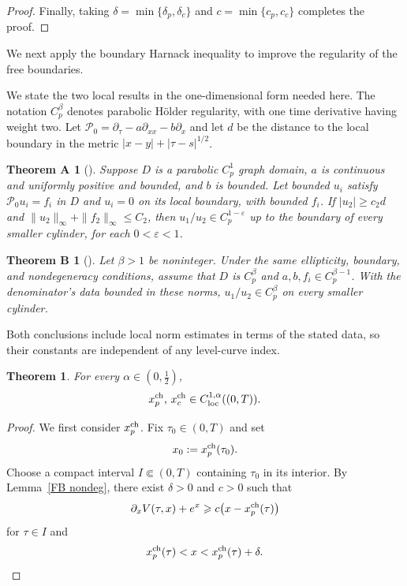 \documentclass[11pt, a4paper, leqno]{amsart}
\numberwithin{equation}{section}
\theoremstyle{plain}
\newtheorem{theorem}{Theorem}[section]
\newtheorem*{bhfirst}{Theorem A}
\newtheorem*{bhhigher}{Theorem B}
\theoremstyle{definition}
\theoremstyle{remark}
\def\leq{\leqslant}
\def\geq{\geqslant}
\begin{document}
{\begin{proof}
Finally, taking
$\delta=\min\{\delta_p,\delta_c\}$ and
$c=\min\{c_p,c_c\}$ completes the proof.
\end{proof}

We next apply the boundary Harnack inequality to improve the
regularity of the free boundaries.

{
We state the two local results in the one-dimensional form needed here.
The notation $C_p^\beta$ denotes parabolic H\"older regularity, with
one time derivative having weight two. Let
$\mathcal P_0=\partial_\tau-a\partial_{xx}-b\partial_x$ and
let $d$ be the distance to the local boundary in the metric
$|x-y|+|\tau-s|^{1/2}$.

\begin{bhfirst}[{\cite[Theorem~1.2]{Kukuljan2022}}]
Suppose $D$ is a parabolic $C_p^1$ graph domain, $a$ is continuous
and uniformly positive and bounded, and $b$ is bounded.
Let bounded $u_i$ satisfy $\mathcal P_0u_i=f_i$ in $D$ and
$u_i=0$ on its local boundary, with bounded $f_i$.
If $|u_2|\geq c_2d$ and
$\|u_2\|_\infty+\|f_2\|_\infty\leq C_2$, then
$u_1/u_2\in C_p^{1-\varepsilon}$ up to the boundary of every smaller
cylinder, for each $0<\varepsilon<1$.
\end{bhfirst}

\begin{bhhigher}[{\cite[Theorem~1.3]{Kukuljan2022}}]
Let $\beta>1$ be noninteger. Under the same ellipticity, boundary,
and nondegeneracy conditions, assume that $D$ is $C_p^\beta$ and
$a,b,f_i\in C_p^{\beta-1}$. With the denominator's data bounded
in these norms, $u_1/u_2\in C_p^\beta$ on every smaller cylinder.
\end{bhhigher}
Both conclusions include local norm estimates in terms of the stated
data, so their constants are independent of any level-curve index.
}

\begin{theorem}\label{C1alpha free boundary}
For every $\alpha\in(0,\frac12)$,
\[
    x_p^{\rm ch},\,x_c^{\rm ch}
    \in C_{\rm loc}^{1,\alpha}((0,T)).
\]
\end{theorem}

\begin{proof}
We first consider $x_p^{\rm ch}$.
Fix $\tau_0\in(0,T)$ and set
\[
    x_0:=x_p^{\rm ch}(\tau_0).
\]
Choose a compact interval $I\Subset(0,T)$ containing $\tau_0$ in its
interior. By Lemma~\ref{FB nondeg}, there exist $\delta>0$ and $c>0$
such that
\[
    \partial_xV(\tau,x)+e^x
    \geq
    c\bigl(x-x_p^{\rm ch}(\tau)\bigr)
\]
for $\tau\in I$ and
\[
    x_p^{\rm ch}(\tau)
    <x<
    x_p^{\rm ch}(\tau)+\delta.
\]


\end{proof}}
\end{document}
